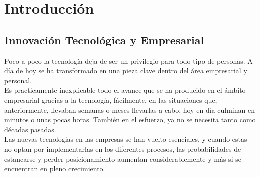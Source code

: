 \documentclass[runningheads,a4paper,12pt]{report}
\begin{document}
\tableofcontents
\pagebreak

\listoffigures

\newpage

\setcounter{page}{4}
\pagestyle{plain}

\section{Introducción}
\subsection{Innovación Tecnológica y Empresarial}
Poco a poco la tecnología deja de ser un privilegio para todo tipo de personas. A día de hoy se ha transformado en una pieza clave dentro del área empresarial y personal\cite{actualidad}.\\

Es practicamente inexplicable todo el avance que se ha producido en el ámbito empresarial gracias a la tecnología, fácilmente, en las situaciones que, anteriormente, llevaban semanas o meses llevarlas a cabo, hoy en día culminan en minutos o unas pocas horas. También en el esfuerzo, ya no se necesita tanto como décadas pasadas.\\

Las nuevas tecnologias en las empresas se han vuelto esenciales, y cuando estas no optan por implementarlas en los diferentes procesos, las probabilidades de estancarse y perder posicionamiento aumentan considerablemente y más si se encuentran en pleno crecimiento.\\
\end{document}

